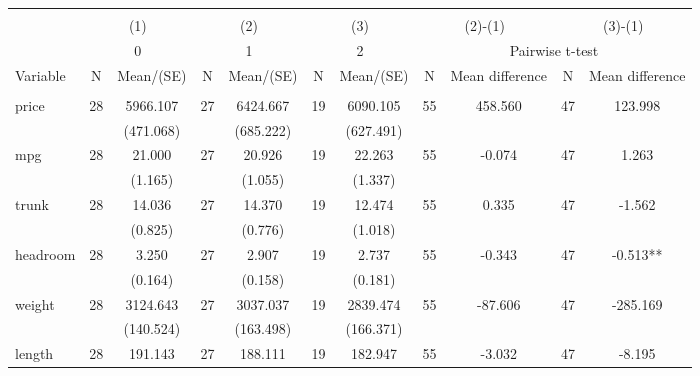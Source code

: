 
\begin{tabular}{@{\extracolsep{5pt}}lcccccccccc}
\\[-1.8ex]\hline \hline \\[-1.8ex]
 & \multicolumn{2}{c}{(1)}  & \multicolumn{2}{c}{(2)}  & \multicolumn{2}{c}{(3)}  & \multicolumn{2}{c}{(2)-(1)} & \multicolumn{2}{c}{(3)-(1)} \\
 & \multicolumn{2}{c}{0}  & \multicolumn{2}{c}{1}  & \multicolumn{2}{c}{2}  & \multicolumn{4}{c}{Pairwise t-test}  \\
Variable & N & Mean/(SE) & N & Mean/(SE) & N & Mean/(SE) & N & Mean difference & N & Mean difference \\ \hline \\[-1.8ex] 
price   & 28    & 5966.107    & 27    & 6424.667    & 19    & 6090.105    & 55    & 458.560    & 47    & 123.998   \\
 &   & (471.068)  &   & (685.222)  &   & (627.491)  &   &  &   &  \\ [1ex]
mpg   & 28    & 21.000    & 27    & 20.926    & 19    & 22.263    & 55    & -0.074    & 47    & 1.263   \\
 &   & (1.165)  &   & (1.055)  &   & (1.337)  &   &  &   &  \\ [1ex]
trunk   & 28    & 14.036    & 27    & 14.370    & 19    & 12.474    & 55    & 0.335    & 47    & -1.562   \\
 &   & (0.825)  &   & (0.776)  &   & (1.018)  &   &  &   &  \\ [1ex]
headroom   & 28    & 3.250    & 27    & 2.907    & 19    & 2.737    & 55    & -0.343    & 47    & -0.513**   \\
 &   & (0.164)  &   & (0.158)  &   & (0.181)  &   &  &   &  \\ [1ex]
weight   & 28    & 3124.643    & 27    & 3037.037    & 19    & 2839.474    & 55    & -87.606    & 47    & -285.169   \\
 &   & (140.524)  &   & (163.498)  &   & (166.371)  &   &  &   &  \\ [1ex]
length   & 28    & 191.143    & 27    & 188.111    & 19    & 182.947    & 55    & -3.032    & 47    & -8.195   \\

\end{tabular}
